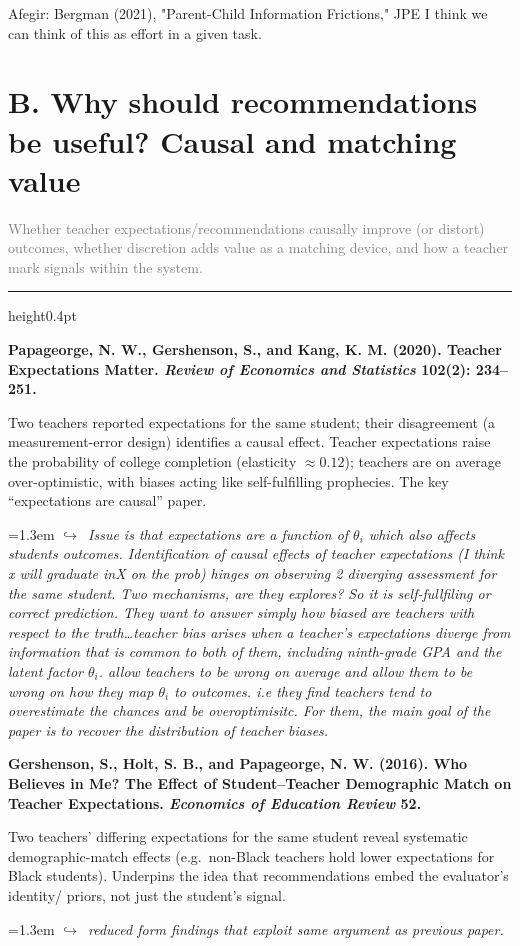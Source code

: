 \documentclass[11pt]{article}
\newcommand{\entry}[3]{%
  \par\medskip\noindent\textbf{#1}\par
  \nopagebreak #2\hspace{0.35em}{\small\color{tagcol}[#3]}\par}
\newcommand{\note}[1]{\par\smallskip\noindent\hangindent=1.3em
  \textcolor{notecol}{\footnotesize$\hookrightarrow$~\textit{#1}}}
\newcommand{\secintro}[1]{\par\smallskip\noindent\textcolor{grey}{\small #1}\par
  \vspace{2pt}\hrule height0.4pt\vspace{4pt}}
\begin{document}
Afegir:
Bergman (2021), "Parent-Child Information Frictions," JPE 
I think we can think of this as effort in a given task. 
\section{B. Why should recommendations be useful? Causal and matching value}
\secintro{Whether teacher expectations/recommendations causally improve (or distort)
outcomes, whether discretion adds value as a matching device, and how a teacher mark
signals within the system.}

\entry{Papageorge, N. W., Gershenson, S., and Kang, K. M. (2020). Teacher
Expectations Matter. \textit{Review of Economics and Statistics} 102(2): 234--251.}
{Two teachers reported expectations for the same student; their disagreement (a
measurement-error design) identifies a causal effect. Teacher expectations raise the
probability of college completion (elasticity $\approx 0.12$); teachers are on average
over-optimistic, with biases acting like self-fulfilling prophecies. The key
``expectations are causal'' paper.}{RF}
\note{Issue is that expectations are a function of $\theta_i$ which also affects students outcomes. Identification of causal effects of teacher expectations (I think x will graduate inX on the prob) hinges on observing 2 diverging assessment for the same student. Two mechanisms, are they explores? So it is self-fullfiling or correct prediction. They want to answer simply how biased are teachers with respect to the truth\dots teacher bias arises when a teacher’s expectations diverge from information that is common to both of them, including ninth-grade GPA and the latent factor $\theta_i$. allow teachers to be wrong on average and allow them to be wrong on how they map $\theta_{i}$ to outcomes. i.e they find teachers tend to overestimate the chances and be overoptimisitc. For them, the main goal of the paper is to recover the distribution of teacher biases. }

\entry{Gershenson, S., Holt, S. B., and Papageorge, N. W. (2016). Who Believes in
Me? The Effect of Student--Teacher Demographic Match on Teacher Expectations.
\textit{Economics of Education Review} 52.}
{Two teachers' differing expectations for the same student reveal systematic
demographic-match effects (e.g.\ non-Black teachers hold lower expectations for Black
students). Underpins the idea that recommendations embed the evaluator's identity/
priors, not just the student's signal.}{RF}
\note{reduced form findings that exploit same argument as previous paper.}
\end{document}
